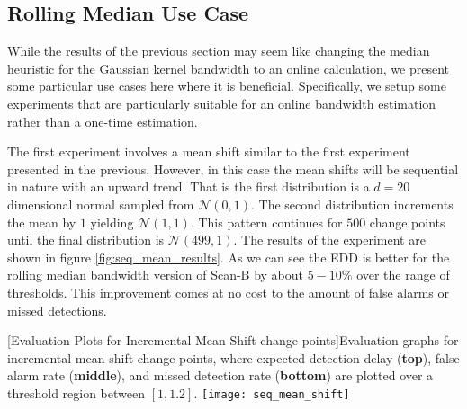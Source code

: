 \subsection{Rolling Median Use Case}

While the results of the previous section may seem like changing the median heuristic for the Gaussian kernel bandwidth to an online calculation, we present some particular use cases here where it is beneficial. Specifically, we setup some experiments that are particularly suitable for an online bandwidth estimation rather than a one-time estimation.

The first experiment involves a mean shift similar to the first experiment presented in the previous. However, in this case the mean shifts will be sequential in nature with an upward trend. That is the first distribution is a $d=20$ dimensional normal sampled from $\mathcal{N}(0,1)$. The second distribution increments the mean by $1$ yielding $\mathcal{N}(1,1)$. This pattern continues for $500$ change points until the final distribution is $\mathcal{N}(499,1)$. The results of the experiment are shown in figure \ref{fig:seq_mean_results}. As we can see the EDD is better for the rolling median bandwidth version of Scan-B by about $5-10\%$ over the range of thresholds. This improvement comes at no cost to the amount of false alarms or missed detections.

\begin{minipage}{\textwidth}
\begin{center} 
[Evaluation Plots for Incremental Mean Shift change points]{Evaluation graphs for incremental mean shift change points, where expected detection delay (\textbf{top}), false alarm rate (\textbf{middle}), and missed detection rate (\textbf{bottom}) are plotted over a threshold region between $[1,1.2]$. } 
\texttt{[image: seq\_mean\_shift]} 
\label{fig:seq_mean_results} 
\end{center}
\end{minipage}